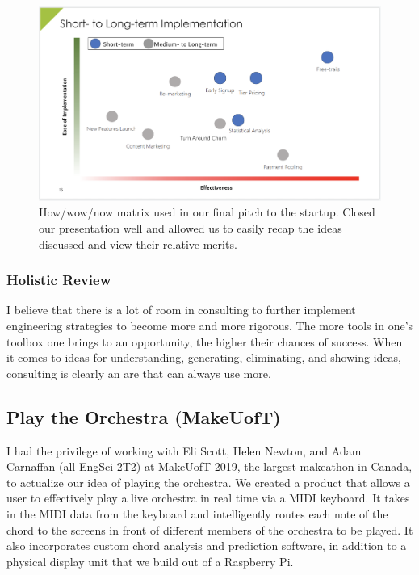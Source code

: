 \documentclass[a4paper,12pt]{article}
\begin{document}
\begin{figure}[H]
\centering
\includegraphics[width=1\textwidth]{img/image011.png}
\caption{How/wow/now matrix used in our final pitch to the startup. Closed our presentation well and allowed us to easily recap the ideas discussed and view their relative merits.}
\label{}
\end{figure}

\subsubsection{Holistic Review}
I believe that there is a lot of room in consulting to further implement engineering strategies to become more and more rigorous. The more tools in one’s toolbox one brings to an opportunity, the higher their chances of success. When it comes to ideas for understanding, generating, eliminating, and showing ideas, consulting is clearly an are that can always use more.

\subsection{Play the Orchestra (MakeUofT)}
\label{sec:orch}

I had the privilege of working with Eli Scott, Helen Newton, and Adam Carnaffan (all EngSci 2T2) at MakeUofT 2019, the largest makeathon in Canada, to actualize our idea of playing the orchestra. We created a product that allows a user to effectively play a live orchestra in real time via a MIDI keyboard. It takes in the MIDI data from the keyboard and intelligently routes each note of the chord to the screens in front of different members of the orchestra to be played. It also incorporates custom chord analysis and prediction software, in addition to a physical display unit that we build out of a Raspberry Pi. 
\end{document}

